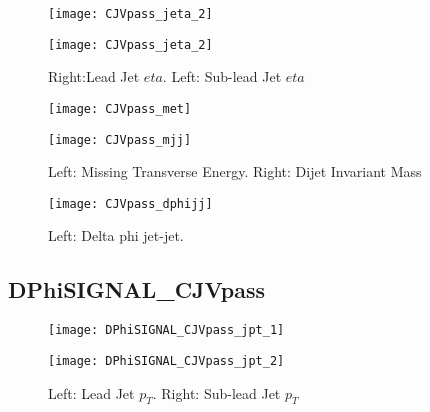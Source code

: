 \documentclass[a4paper,10pt]{article}
\begin{document}
\begin{figure}[!h]
\centering
\begin{minipage}[!h]{0.4\linewidth}
\centering
\texttt{[image: CJVpass\_jeta\_2]}
\end{minipage}%
\begin{minipage}[!h]{0.4\linewidth}
\centering
\texttt{[image: CJVpass\_jeta\_2]}
\end{minipage}
\caption{Right:Lead Jet $eta$. Left: Sub-lead Jet $eta$}
\end{figure}

\begin{figure}[!h]
\centering
\begin{minipage}[!h]{0.4\linewidth}
\centering
\texttt{[image: CJVpass\_met]}
\end{minipage}%
\begin{minipage}[!h]{0.4\linewidth}
\centering
\texttt{[image: CJVpass\_mjj]}
\end{minipage}
\caption{Left: Missing Transverse Energy. Right: Dijet Invariant Mass}
\end{figure}

\begin{figure}[!h]
\centering
\begin{minipage}[!h]{0.4\linewidth}
\centering
\texttt{[image: CJVpass\_dphijj]}
\end{minipage}%
\begin{minipage}[!h]{0.4\linewidth}
\centering
\end{minipage}
\caption{Left: Delta phi jet-jet.}
\end{figure}

\clearpage
\subsection{DPhiSIGNAL\_CJVpass}

\begin{figure}[!h]
\centering
\begin{minipage}[!h]{0.4\linewidth}
\centering
\texttt{[image: DPhiSIGNAL\_CJVpass\_jpt\_1]}
\end{minipage}%
\begin{minipage}[!h]{0.4\linewidth}
  \texttt{[image: DPhiSIGNAL\_CJVpass\_jpt\_2]}
\end{minipage}
\caption{Left: Lead Jet $p_T$. Right: Sub-lead Jet $p_T$}
\end{figure}
\end{document}
